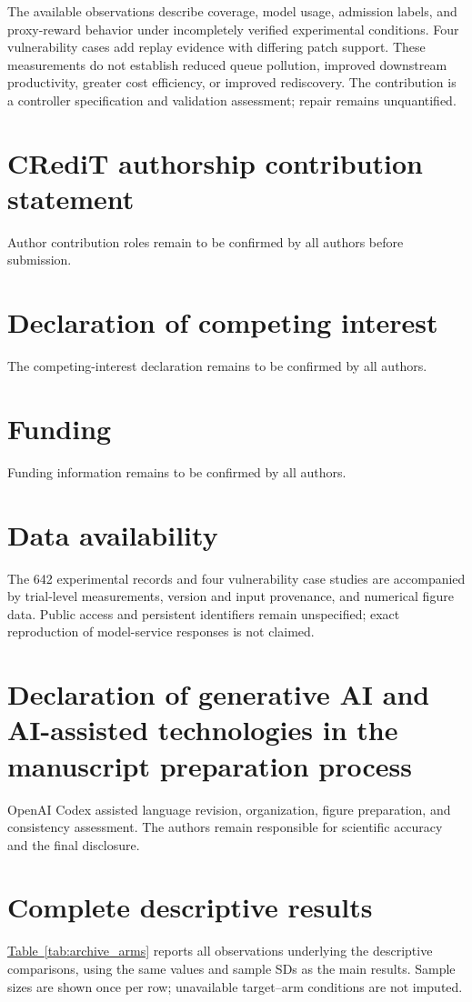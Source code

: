\documentclass[final,5p,times,number]{elsarticle}
\newcommand{\namedref}[2]{\hyperref[#2]{#1~\ref*{#2}}}
\begin{document}
The available observations describe coverage, model usage, admission labels, and proxy-reward behavior under incompletely verified experimental conditions. Four vulnerability cases add replay evidence with differing patch support. These measurements do not establish reduced queue pollution, improved downstream productivity, greater cost efficiency, or improved rediscovery. The contribution is a controller specification and validation assessment; repair remains unquantified.

\section*{CRediT authorship contribution statement}
Author contribution roles remain to be confirmed by all authors before submission.
\section*{Declaration of competing interest}
The competing-interest declaration remains to be confirmed by all authors.
\section*{Funding}
Funding information remains to be confirmed by all authors.
\section*{Data availability}
The 642 experimental records and four vulnerability case studies are accompanied by trial-level measurements, version and input provenance, and numerical figure data. Public access and persistent identifiers remain unspecified; exact reproduction of model-service responses is not claimed.
\section*{Declaration of generative AI and AI-assisted technologies in the manuscript preparation process}
OpenAI Codex assisted language revision, organization, figure preparation, and consistency assessment. The authors remain responsible for scientific accuracy and the final disclosure.

\appendix
\setcounter{table}{0}
\renewcommand{\theHtable}{appendix.\Alph{section}.\arabic{table}}
\section{Complete descriptive results}
\label{sec:archive_appendix}
\namedref{Table}{tab:archive_arms} reports all observations underlying the descriptive comparisons, using the same values and sample SDs as the main results. Sample sizes are shown once per row; unavailable target--arm conditions are not imputed.




\end{document}
